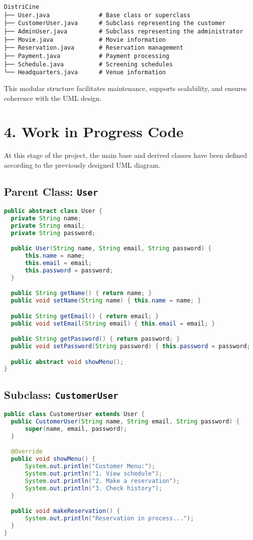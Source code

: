 \documentclass[man]{apa7}
\begin{document}
\begin{lstlisting}
DistriCine
├── User.java              # Base class or superclass
├── CustomerUser.java      # Subclass representing the customer
├── AdminUser.java         # Subclass representing the administrator
├── Movie.java             # Movie information
├── Reservation.java       # Reservation management
├── Payment.java           # Payment processing
├── Schedule.java          # Screening schedules
└── Headquarters.java      # Venue information
\end{lstlisting}

This modular structure facilitates maintenance, supports scalability, and ensures coherence with the UML design.

\section{4. Work in Progress Code}

At this stage of the project, the main base and derived classes have been defined according to the previously designed UML diagram.

\subsection{Parent Class: \texttt{User}}
\begin{lstlisting}[language=Java]
public abstract class User {
  private String name;
  private String email;
  private String password;

  public User(String name, String email, String password) {
      this.name = name;
      this.email = email;
      this.password = password;
  }

  public String getName() { return name; }
  public void setName(String name) { this.name = name; }

  public String getEmail() { return email; }
  public void setEmail(String email) { this.email = email; }

  public String getPassword() { return password; }
  public void setPassword(String password) { this.password = password; }

  public abstract void showMenu();
}
\end{lstlisting}
\newpage

\subsection{Subclass: \texttt{CustomerUser}}
\begin{lstlisting}[language=Java]
public class CustomerUser extends User {
  public CustomerUser(String name, String email, String password) {
      super(name, email, password);
  }

  @Override
  public void showMenu() {
      System.out.println("Customer Menu:");
      System.out.println("1. View schedule");
      System.out.println("2. Make a reservation");
      System.out.println("3. Check history");
  }

  public void makeReservation() {
      System.out.println("Reservation in process...");
  }
}
\end{lstlisting}
\end{document}
